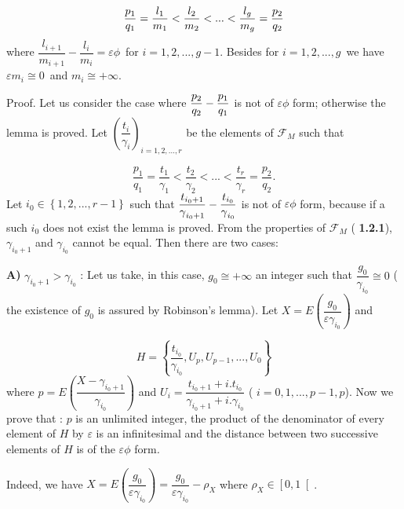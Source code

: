 \documentclass[12pt]{article}
\begin{document}
\begin{equation*}
\dfrac{p_{1}}{q_{1}}=\dfrac{l_{1}}{m_{1}}<\dfrac{l_{2}}{m_{2}}<...<\dfrac{%
l_{g}}{m_{g}}=\dfrac{p_{2}}{q_{2}}
\end{equation*}%
where $\dfrac{l_{i+1}}{m_{i+1}}-\dfrac{l_{i}}{m_{i}}=\varepsilon \phi $\ for 
$i=1,2,...,g-1$. Besides for $i=1,2,...,g$\ we have $\varepsilon m_{i}\cong
0 $\ and $m_{i}\cong +\infty $.\newline

\noindent Proof. Let us consider the case where $\dfrac{p_{2}}{q_{2}}-\dfrac{%
p_{1}}{q_{1}}$ is not of $\varepsilon \phi $ form; otherwise the lemma is
proved. Let $\left( \dfrac{t_{i}}{\gamma _{i}}\right) _{i=1,2,...,r}$ be the
elements of $\mathcal{F}_{M}$ such that

\begin{equation*}
\dfrac{p_{1}}{q_{1}}=\dfrac{t_{1}}{\gamma _{1}}<\dfrac{t_{2}}{\gamma _{2}}%
<...<\dfrac{t_{r}}{\gamma _{r}}=\dfrac{p_{2}}{q_{2}}\text{.}
\end{equation*}%
Let $i_{0}\in \left\{ 1,2,...,r-1\right\} $ such that $\dfrac{t_{i_{0}+1}}{%
\gamma _{i_{0}+1}}-\dfrac{t_{i_{0}}}{\gamma _{i_{0}}}$ is not of $%
\varepsilon \phi $ form, because if a such $i_{0}$ does not exist the lemma
is proved. From the properties of $\mathcal{F}_{M}$ ( \textbf{1.2.1}), $%
\gamma _{i_{0}+1}$ and $\gamma _{i_{0}}$ cannot be equal. Then there are two
cases:

\noindent \textbf{A)} $\gamma _{i_{0}+1}>\gamma _{i_{0}}$ : Let us take, in
this case, $g_{0}\cong +\infty $ an integer such that $\dfrac{g_{0}}{\gamma
_{i_{0}}}\cong 0$ ( the existence of $g_{0}$ is assured by Robinson's
lemma). Let $X=E\left( \dfrac{g_{0}}{\varepsilon \gamma _{i_{0}}}\right) $
and

\begin{equation*}
H=\left\{ \dfrac{t_{i_{0}}}{\gamma _{i_{0}}},U_{p},U_{p-1},...,U_{0}\right\}
\end{equation*}%
where $p=E\left( \dfrac{X-\gamma _{i_{0}+1}}{\gamma _{i_{0}}}\right) $ and $%
U_{i}=\dfrac{t_{i_{0}+1}+i.t_{i_{0}}}{\gamma _{i_{0}+1}+i.\gamma _{i_{0}}}$ (%
$i=0,1,...,p-1,p$). Now we prove that : $p$ is an unlimited integer, the
product of the denominator of every element of $H$ by $\varepsilon $ is an
infinitesimal and the distance between two successive elements of $H$ is of
the $\varepsilon \phi $ form\textit{.}

Indeed, we have $X=E\left( \dfrac{g_{0}}{\varepsilon \gamma _{i_{0}}}\right)
=\dfrac{g_{0}}{\varepsilon \gamma _{i_{0}}}-\rho _{X}$ where $\rho _{X}\in %
\left[ 0,1\right[ $.
\end{document}
